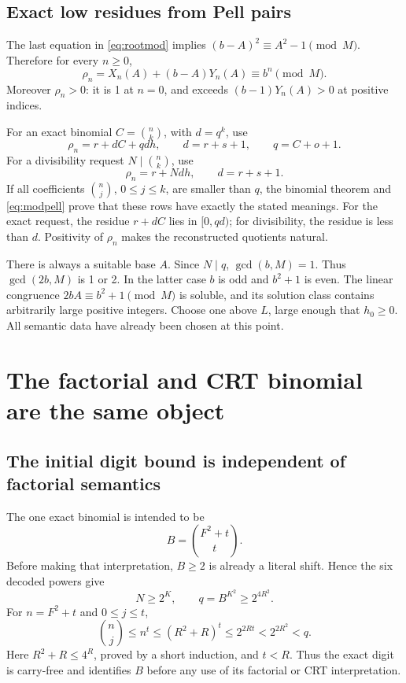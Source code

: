 \documentclass[11pt,a4paper]{article}
\theoremstyle{remark}
\begin{document}
\subsection{Exact low residues from Pell pairs}

The last equation in \eqref{eq:rootmod} implies
\((b-A)^2\equiv A^2-1\pmod M\). Therefore for every \(n\ge0\),
\begin{equation}\label{eq:modpell}
 \rho_n=X_n(A)+(b-A)Y_n(A)\equiv b^n\pmod M.
\end{equation}
Moreover \(\rho_n>0\): it is 1 at \(n=0\), and exceeds
\((b-1)Y_n(A)>0\) at positive indices.

For an exact binomial \(C=\binom nk\), with \(d=q^k\), use
\begin{equation}\label{eq:exactdigit}
 \rho_n=r+dC+qd h,\qquad d=r+s+1,\qquad q=C+o+1.
\end{equation}
For a divisibility request \(N\mid\binom nk\), use
\begin{equation}\label{eq:divdigit}
 \rho_n=r+Nd h,\qquad d=r+s+1.
\end{equation}
If all coefficients \(\binom nj\), \(0\le j\le k\), are smaller than
\(q\), the binomial theorem and \eqref{eq:modpell} prove that these rows
have exactly the stated meanings. For the exact request, the residue
\(r+dC\) lies in \([0,qd)\); for divisibility, the residue is less than
\(d\). Positivity of \(\rho_n\) makes the reconstructed quotients natural.

There is always a suitable base \(A\). Since \(N\mid q\),
\(\gcd(b,M)=1\). Thus \(\gcd(2b,M)\) is 1 or 2. In the latter case
\(b\) is odd and \(b^2+1\) is even. The linear congruence
\(2bA\equiv b^2+1\pmod M\) is soluble, and its solution class contains
arbitrarily large positive integers. Choose one above \(L\), large enough
that \(h_0\ge0\). All semantic data have already been chosen at this point.

\section{The factorial and CRT binomial are the same object}

\subsection{The initial digit bound is independent of factorial semantics}

The one exact binomial is intended to be
\[
 B=\binom{F^2+t}{t}.
\]
Before making that interpretation, \(B\ge2\) is already a literal shift.
Hence the six decoded powers give
\[
 N\ge2^K,\qquad q=B^{K^2}\ge2^{4R^2}.
\]
For \(n=F^2+t\) and \(0\le j\le t\),
\[
 \binom nj\le n^t\le(R^2+R)^t\le2^{2Rt}<2^{2R^2}<q.
\]
Here \(R^2+R\le4^R\), proved by a short induction, and \(t<R\).
Thus the exact digit is carry-free and identifies \(B\) before any use
of its factorial or CRT interpretation.
\end{document}

